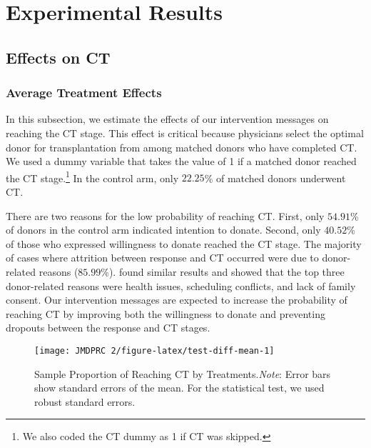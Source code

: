 \documentclass[12pt, a4paper]{article}
\begin{document}
\hypertarget{result}{%
\section{Experimental Results}\label{result}}

\hypertarget{main}{%
\subsection{Effects on CT}\label{main}}

\hypertarget{average-treatment-effects}{%
\subsubsection{Average Treatment Effects}\label{average-treatment-effects}}

In this subsection, we estimate the effects of our intervention messages on reaching the CT stage. This effect is critical because physicians select the optimal donor for transplantation from among matched donors who have completed CT. We used a dummy variable that takes the value of 1 if a matched donor reached the CT stage.\footnote{We also coded the CT dummy as 1 if CT was skipped.} In the control arm, only \(22.25\)\% of matched donors underwent CT.

There are two reasons for the low probability of reaching CT. First, only \(54.91\)\% of donors in the control arm indicated intention to donate. Second, only \(40.52\)\% of those who expressed willingness to donate reached the CT stage. The majority of cases where attrition between response and CT occurred were due to donor-related reasons (\(85.99\)\%). \citet{Hirakawa2018} found similar results and showed that the top three donor-related reasons were health issues, scheduling conflicts, and lack of family consent. Our intervention messages are expected to increase the probability of reaching CT by improving both the willingness to donate and preventing dropouts between the response and CT stages.

\begin{figure}[t]
\texttt{[image: JMDPRC~2/figure-latex/test-diff-mean-1]} \caption{Sample Proportion of Reaching CT by Treatments.\newline \emph{Note}: Error bars show standard errors of the mean. For the statistical test, we used robust standard errors.}\label{fig:test-diff-mean}
\end{figure}
\end{document}
